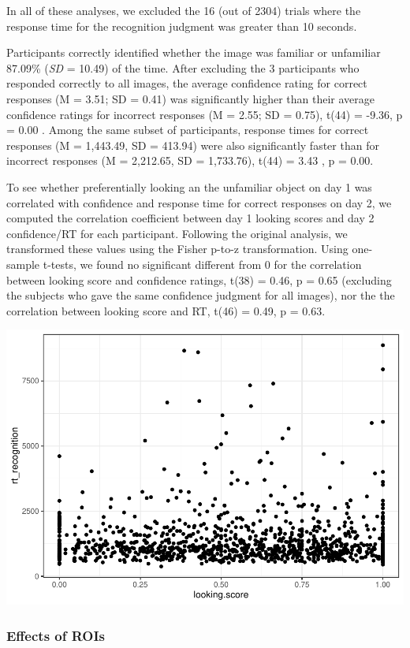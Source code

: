 \documentclass[
  man,floatsintext]{apa6}
\begin{document}
In all of these analyses, we excluded the 16 (out of 2304) trials where the response time for the recognition judgment was greater than 10 seconds.

Participants correctly identified whether the image was familiar or unfamiliar 87.09\% (\emph{SD} = 10.49) of the time. After excluding the 3 participants who responded correctly to all images, the average confidence rating for correct responses (M = 3.51; SD = 0.41) was significantly higher than their average confidence ratings for incorrect responses (M = 2.55; SD = 0.75), t(44) = -9.36, p = 0.00 . Among the same subset of participants, response times for correct responses (M = 1,443.49, SD = 413.94) were also significantly faster than for incorrect responses (M = 2,212.65, SD = 1,733.76), t(44) = 3.43 , p = 0.00.

To see whether preferentially looking an the unfamiliar object on day 1 was correlated with confidence and response time for correct responses on day 2, we computed the correlation coefficient between day 1 looking scores and day 2 confidence/RT for each participant. Following the original analysis, we transformed these values using the Fisher p-to-z transformation. Using one-sample t-tests, we found no significant different from 0 for the correlation between looking score and confidence ratings, t(38) = 0.46, p = 0.65 (excluding the subjects who gave the same confidence judgment for all images), nor the the correlation between looking score and RT, t(46) = 0.49, p = 0.63.

\includegraphics{manuscript_files/figure-latex/Plot Looking Score Correlations-1.pdf}

\hypertarget{effects-of-rois}{%
\subsubsection{Effects of ROIs}\label{effects-of-rois}}
\end{document}
